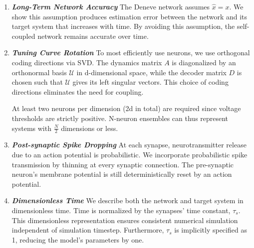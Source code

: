 \begin{enumerate}
    \item \textbf{\textit{Long-Term Network Accuracy}} The Deneve network assumes $\hat{x}=x$. We show this assumption produces estimation error between the network and its target system that increases with time. By avoiding this assumption, the self-coupled network remains accurate over time. 
    
    \item \textbf{\textit{Tuning Curve Rotation}} To most efficiently use neurons, we use orthogonal coding directions via SVD. The dynamics matrix $A$ is diagonalized by an orthonormal basis $\mathcal{U}$ in d-dimensional space, while the decoder matrix $D$ is chosen such that $\mathcal{U}$ gives its left singular vectors. This choice of coding directions eliminates the need for coupling. 
    
 	    
	At least two neurons per dimension (2d in total) are required since voltage thresholds are strictly positive.
    N-neuron ensembles can thus represent systems with $\frac{N}{2}$ dimensions or less. 
    
    \item \textbf{\textit{Post-synaptic Spike Dropping}} At each synapse, neurotransmitter release due to an action potential is probabilistic.  We incorporate probabilistic spike transmission by thinning at every synaptic connection. The pre-synaptic neuron's membrane potential is still deterministically reset by an action potential. 
    
    \item \textbf{\textit{Dimensionless Time}} We describe both the network and target system in dimensionless time. Time is normalized by the synapses' time constant, $\tau_s$. This dimensionless representation ensures consistent numerical simulation independent of simulation timestep. Furthermore, $\tau_s$ is implicitly specified as 1, reducing the model's parameters by one.     
\end{enumerate}

